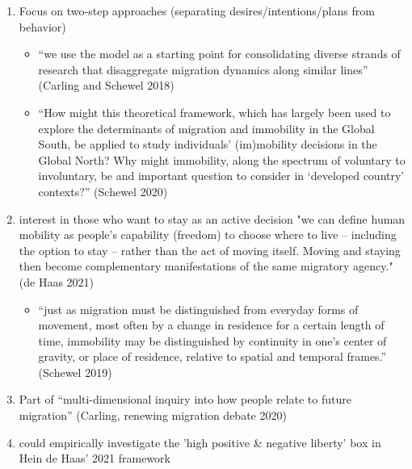 \begin{enumerate}
    \item Focus on two-step approaches (separating desires/intentions/plans from behavior)
    \begin{itemize}
        \item “we use the model as a starting point for consolidating diverse strands of research that disaggregate migration dynamics along similar lines” (Carling and Schewel 2018)
        \item “How might this theoretical framework, which has largely been used to explore the determinants of migration and immobility in the Global South, be applied to study individuals’ (im)mobility decisions in the Global North? Why might immobility, along the spectrum of voluntary to involuntary, be and important question to consider in ‘developed country’ contexts?” (Schewel 2020)
    \end{itemize}
    \item interest in those who want to stay as an active decision "we can define human mobility as people’s capability (freedom) to choose where to live – including the option to stay – rather than the act of moving itself. Moving and staying then become complementary manifestations of the same migratory agency." (de Haas 2021)
    \begin{itemize}
        \item “just as migration must be distinguished from everyday forms of movement, most often by a change in residence for a certain length of time, immobility may be distinguished by continuity in one’s center of gravity, or place of residence, relative to spatial and temporal frames.” (Schewel 2019)
    \end{itemize}
    \item Part of “multi-dimensional inquiry into how people relate to future migration” (Carling, renewing migration debate 2020)
    \item could empirically investigate the 'high positive \& negative liberty' box in Hein de Haas' 2021 framework
\end{enumerate}